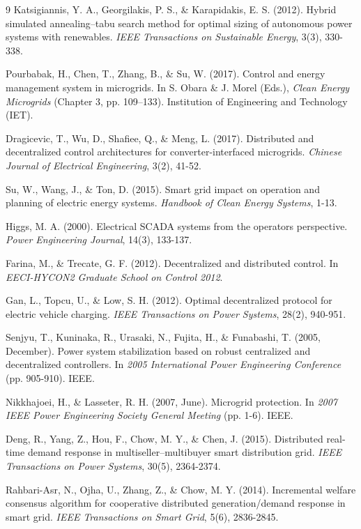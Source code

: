 \documentclass[final,3p,times]{elsarticle}
\begin{document}
\begin{thebibliography}{9}
Katsigiannis, Y. A., Georgilakis, P. S., \& Karapidakis, E. S. (2012). Hybrid simulated annealing–tabu search method for optimal sizing of autonomous power systems with renewables. \textit{IEEE Transactions on Sustainable Energy}, 3(3), 330-338.

Pourbabak, H., Chen, T., Zhang, B., \& Su, W. (2017). Control and energy management system in microgrids. In S. Obara \& J. Morel (Eds.), \textit{Clean Energy Microgrids} (Chapter 3, pp. 109--133). Institution of Engineering and Technology (IET).

Dragicevic, T., Wu, D., Shafiee, Q., \& Meng, L. (2017). Distributed and decentralized control architectures for converter-interfaced microgrids. \textit{Chinese Journal of Electrical Engineering}, 3(2), 41-52.

Su, W., Wang, J., \& Ton, D. (2015). Smart grid impact on operation and planning of electric energy systems. \textit{Handbook of Clean Energy Systems}, 1-13.

Higgs, M. A. (2000). Electrical SCADA systems from the operators perspective. \textit{Power Engineering Journal}, 14(3), 133-137.

Farina, M., \& Trecate, G. F. (2012). Decentralized and distributed control. In \textit{EECI-HYCON2 Graduate School on Control 2012}.

Gan, L., Topcu, U., \& Low, S. H. (2012). Optimal decentralized protocol for electric vehicle charging. \textit{IEEE Transactions on Power Systems}, 28(2), 940-951.

Senjyu, T., Kuninaka, R., Urasaki, N., Fujita, H., \& Funabashi, T. (2005, December). Power system stabilization based on robust centralized and decentralized controllers. In \textit{2005 International Power Engineering Conference} (pp. 905-910). IEEE.

Nikkhajoei, H., \& Lasseter, R. H. (2007, June). Microgrid protection. In \textit{2007 IEEE Power Engineering Society General Meeting} (pp. 1-6). IEEE.

Deng, R., Yang, Z., Hou, F., Chow, M. Y., \& Chen, J. (2015). Distributed real-time demand response in multiseller–multibuyer smart distribution grid. \textit{IEEE Transactions on Power Systems}, 30(5), 2364-2374.

Rahbari-Asr, N., Ojha, U., Zhang, Z., \& Chow, M. Y. (2014). Incremental welfare consensus algorithm for cooperative distributed generation/demand response in smart grid. \textit{IEEE Transactions on Smart Grid}, 5(6), 2836-2845.


\end{thebibliography}
\end{document}
